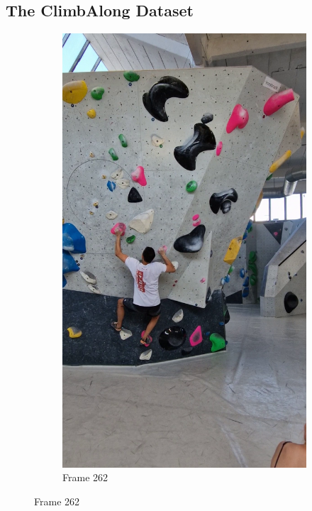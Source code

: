 \documentclass[./main.tex]{subfiles}
\begin{document}
\subsection{The ClimbAlong Dataset}
\begin{figure}[htbp]
    \centering
    \begin{subfigure}{0.3\textwidth}
        \centering
        \includegraphics[width=\textwidth]{entities/CA_262.png}
        \caption{Frame 262}
    \end{subfigure}

\end{figure}
\end{document}
